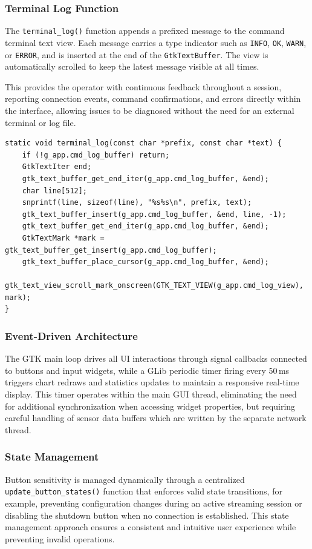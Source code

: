 \subsubsection{Terminal Log Function}

The \texttt{terminal\_log()} function appends a prefixed message to the
command terminal text view. Each message carries a type indicator such
as \texttt{INFO}, \texttt{OK}, \texttt{WARN}, or \texttt{ERROR}, and is
inserted at the end of the \texttt{GtkTextBuffer}. The view is
automatically scrolled to keep the latest message visible at all times.

This provides the operator with continuous feedback throughout a session,
reporting connection events, command confirmations, and errors directly
within the interface, allowing issues to be diagnosed without the need
for an external terminal or log file.

\begin{verbatim}
static void terminal_log(const char *prefix, const char *text) {
    if (!g_app.cmd_log_buffer) return;
    GtkTextIter end;
    gtk_text_buffer_get_end_iter(g_app.cmd_log_buffer, &end);
    char line[512];
    snprintf(line, sizeof(line), "%s%s\n", prefix, text);
    gtk_text_buffer_insert(g_app.cmd_log_buffer, &end, line, -1);
    gtk_text_buffer_get_end_iter(g_app.cmd_log_buffer, &end);
    GtkTextMark *mark = gtk_text_buffer_get_insert(g_app.cmd_log_buffer);
    gtk_text_buffer_place_cursor(g_app.cmd_log_buffer, &end);
    gtk_text_view_scroll_mark_onscreen(GTK_TEXT_VIEW(g_app.cmd_log_view), mark);
}
\end{verbatim}


\subsubsection{Event-Driven Architecture}
The GTK main loop drives all UI interactions through signal callbacks connected to
buttons and input widgets, while a GLib periodic timer firing every 50\,ms triggers
chart redraws and statistics updates to maintain a responsive real-time display.
This timer operates within the main GUI thread, eliminating the need for additional
synchronization when accessing widget properties, but requiring careful handling of
sensor data buffers which are written by the separate network thread.

\subsubsection{State Management}
Button sensitivity is managed dynamically through a centralized
\texttt{update\_button\_states()} function that enforces valid state transitions,
for example, preventing configuration changes during an active streaming session or
disabling the shutdown button when no connection is established. This state
management approach ensures a consistent and intuitive user experience while
preventing invalid operations.


